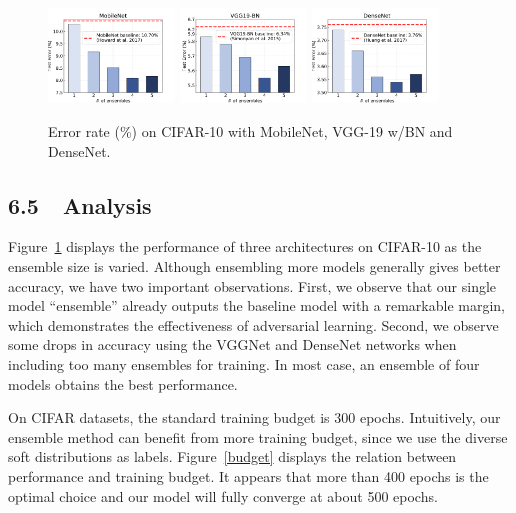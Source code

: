 \documentclass[letterpaper]{article} %
\begin{document}
\begin{figure}[t]
	\centering
	\includegraphics[width=0.3\textwidth]{figs/mobilenet_number}
	\includegraphics[width=0.3\textwidth]{figs/VGG_number}
	\includegraphics[width=0.3\textwidth]{figs/densenet_number}
	\vspace{-0.10in}
	\caption{Error rate (\%) on CIFAR-10 with MobileNet, VGG-19 w/BN and DenseNet.}
	\label{num}
			\vspace{-0.1in}
\end{figure}

\subsection{6.5~~Analysis}
Figure~\ref{num} displays the performance of three architectures on CIFAR-10 as the ensemble size is varied. Although ensembling more models generally gives better accuracy, we have two important observations. First, we observe that our single model ``ensemble'' already outputs the baseline model with a remarkable margin, which demonstrates the effectiveness of adversarial learning. Second, we observe some drops in accuracy using the VGGNet and DenseNet networks when including too many ensembles for training. In most case, an ensemble of four models obtains the best performance.

On CIFAR datasets, the standard training budget is 300 epochs. Intuitively, our ensemble method can benefit from more training budget, since we use the diverse soft distributions as labels. Figure~\ref{budget} displays the relation between performance and training budget. It appears that more than 400 epochs is the optimal choice and our model will fully converge at about 500 epochs.
\end{document}
